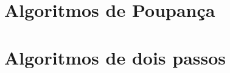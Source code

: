 \documentclass[a4paper,12pt]{book}
\begin{document}
\chapter{Algoritmos de Poupança}




\chapter{Algoritmos de dois passos}

\end{document}

